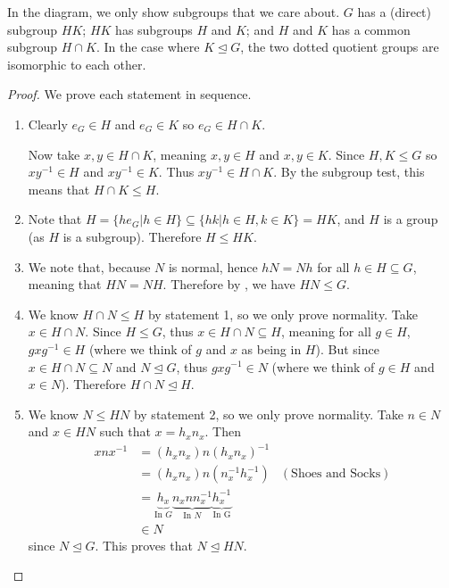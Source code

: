 In the diagram, we only show subgroups that we care about. $G$ has a (direct) subgroup $HK$; $HK$ has subgroups $H$ and $K$; and $H$ and $K$ has a common subgroup $H\cap K$. In the case where $K \unlhd G$, the two dotted quotient groups are isomorphic to each other.

\begin{proof}
    We prove each statement in sequence.

    \begin{enumerate}
        \item Clearly $e_G \in H$ and $e_G \in K$ so $e_G \in H \cap K$.
        
        Now take $x, y \in H \cap K$, meaning $x, y \in H$ and $x, y \in K$. Since $H, K \leq G$ so $xy^{-1} \in H$ and $xy^{-1} \in K$. Thus $xy^{-1} \in H \cap K$. By the subgroup test, this means that $H \cap K \leq H$.
        
        \item Note that $H = \{he_G \vert h \in H\} \subseteq \{hk \vert h \in H, k \in K\} = HK$, and $H$ is a group (as $H$ is a subgroup). Therefore $H \leq HK$.
        
        \item We note that, because $N$ is normal, hence $hN = Nh$ for all $h \in H \subseteq G$, meaning that $HN = NH$. Therefore by , we have $HN \leq G$.

        \item We know $H \cap N \leq H$ by statement 1, so we only prove normality. Take $x \in H \cap N$. Since $H \leq G$, thus $x \in H \cap N \subseteq H$, meaning for all $g \in H$, $gxg^{-1} \in H$ (where we think of $g$ and $x$ as being in $H$). But since $x \in H \cap N \subseteq N$ and $N \unlhd G$, thus $gxg^{-1} \in N$ (where we think of $g \in H$ and $x \in N$). Therefore $H \cap N \unlhd H$.

        \item We know $N \leq HN$ by statement 2, so we only prove normality. Take $n \in N$ and $x \in HN$ such that $x = h_xn_x$. Then
        \begin{align*}
            xnx^{-1} &= (h_xn_x)n(h_xn_x)^{-1}\\
            &= (h_xn_x)n(n_x^{-1}h_x^{-1}) & (\text{Shoes and Socks})\\
            &= \underbrace{h_x}_{\text{In }G}\underbrace{n_xnn_x^{-1}}_{\text{In }N}\underbrace{h_x^{-1}}_{\text{In G}}\\
            &\in N
        \end{align*}
        since $N \unlhd G$. This proves that $N \unlhd HN$.


\end{enumerate}
\end{proof}
